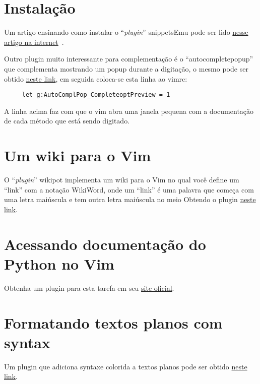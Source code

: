 \section{Instalação}
\label{Instalação}

Um artigo ensinando como instalar o ``{\em plugin}'' snippetsEmu pode ser lido 
\href{http://vivaotux.blogspot.com/2008/03/instalando-o-plugin-snippetsemu-no-vim.html}{nesse artigo na internet}~\cite{SilvasnipptsEmu}.

Outro plugin muito interessante para complementação é o ``autocompletepopup'' que complementa 
mostrando um popup durante a digitação, o mesmo pode ser obtido 
\href{http://www.vim.org/scripts/script.php?script\_id=1879}{neste link}, em seguida coloca-se esta 
linha ao vimrc:

\begin{verbatim}
     let g:AutoComplPop_CompleteoptPreview = 1
\end{verbatim}

A linha acima faz com que o vim abra uma janela pequena com a documentação
de cada método que está sendo digitado.

\section{Um wiki para o Vim}\label{sec:Um wiki para o Vim}
O ``{\em plugin}'' wikipot implementa um wiki para o Vim no qual você define
um ``link'' com a notação WikiWord, onde um ``link'' é uma palavra que
começa com uma letra maiúscula e tem outra letra maiúscula no meio
Obtendo o plugin  \href{http://www.vim.org/scripts/script.php?script\_id=1018}{neste link}.

\section{Acessando documentação do Python no Vim}\label{Acessando documentação do Python no Vim}
 Obtenha um plugin para esta tarefa em seu 
 \href{http://www.vim.org/scripts/script.php?script\_id=910}{site oficial}.

\section{Formatando textos planos com syntax}\label{Formatando textos planos com syntax}
Um plugin que adiciona syntaxe colorida a textos planos pode ser obtido
\href{http://www.vim.org/scripts/script.php?script\_id=2208&rating=helpful#1.3}{neste link}.

